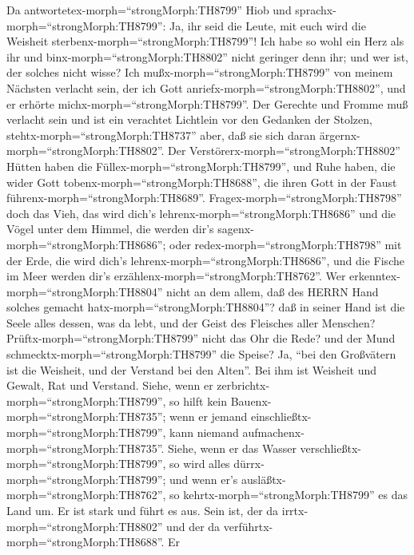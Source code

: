  Da antwortetex-morph=``strongMorph:TH8799'' Hiob und
sprachx-morph=``strongMorph:TH8799'':  Ja, ihr seid die
Leute, mit euch wird die Weisheit sterbenx-morph=``strongMorph:TH8799''!
 Ich habe so wohl ein Herz als ihr und
binx-morph=``strongMorph:TH8802'' nicht geringer denn ihr; und wer ist,
der solches nicht wisse?  Ich
mußx-morph=``strongMorph:TH8799'' von meinem Nächsten verlacht sein, der
ich Gott anriefx-morph=``strongMorph:TH8802'', und er erhörte
michx-morph=``strongMorph:TH8799''. Der Gerechte und Fromme muß verlacht
sein  und ist ein verachtet Lichtlein vor den Gedanken der
Stolzen, stehtx-morph=``strongMorph:TH8737'' aber, daß sie sich daran
ärgernx-morph=``strongMorph:TH8802''.  Der
Verstörerx-morph=``strongMorph:TH8802'' Hütten haben die
Füllex-morph=``strongMorph:TH8799'', und Ruhe haben, die wider Gott
tobenx-morph=``strongMorph:TH8688'', die ihren Gott in der Faust
führenx-morph=``strongMorph:TH8689''. 
Fragex-morph=``strongMorph:TH8798'' doch das Vieh, das wird dich's
lehrenx-morph=``strongMorph:TH8686'' und die Vögel unter dem Himmel, die
werden dir's sagenx-morph=``strongMorph:TH8686'';  oder
redex-morph=``strongMorph:TH8798'' mit der Erde, die wird dich's
lehrenx-morph=``strongMorph:TH8686'', und die Fische im Meer werden
dir's erzählenx-morph=``strongMorph:TH8762''.  Wer
erkenntex-morph=``strongMorph:TH8804'' nicht an dem allem, daß des HERRN
Hand solches gemacht hatx-morph=``strongMorph:TH8804''? 
daß in seiner Hand ist die Seele alles dessen, was da lebt, und der
Geist des Fleisches aller Menschen? 
Prüftx-morph=``strongMorph:TH8799'' nicht das Ohr die Rede? und der Mund
schmecktx-morph=``strongMorph:TH8799'' die Speise?  Ja,
``bei den Großvätern ist die Weisheit, und der Verstand bei den Alten''.
 Bei ihm ist Weisheit und Gewalt, Rat und Verstand.
 Siehe, wenn er zerbrichtx-morph=``strongMorph:TH8799'', so
hilft kein Bauenx-morph=``strongMorph:TH8735''; wenn er jemand
einschließtx-morph=``strongMorph:TH8799'', kann niemand
aufmachenx-morph=``strongMorph:TH8735''.  Siehe, wenn er
das Wasser verschließtx-morph=``strongMorph:TH8799'', so wird alles
dürrx-morph=``strongMorph:TH8799''; und wenn er's
ausläßtx-morph=``strongMorph:TH8762'', so
kehrtx-morph=``strongMorph:TH8799'' es das Land um.  Er ist
stark und führt es aus. Sein ist, der da
irrtx-morph=``strongMorph:TH8802'' und der da
verführtx-morph=``strongMorph:TH8688''.  Er
